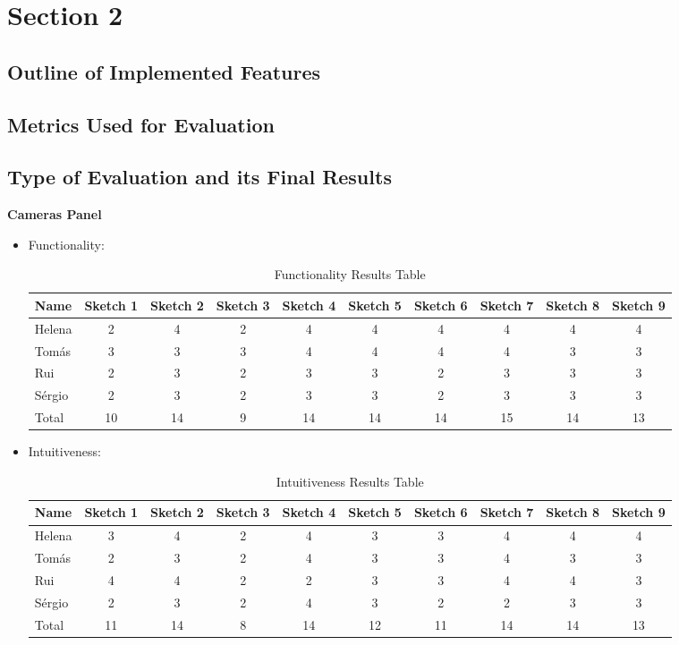 \chapter{Section 2} \label{section2}
\section{Outline of Implemented Features}
\section{Metrics Used for Evaluation}
\section{Type of Evaluation and its Final Results}
\textbf{Cameras Panel}
\begin{itemize}
    \item Functionality: 
\begin{table}[H]
\caption{Functionality Results Table}
\begin{tabular}{l*{9}{c}}
Name & Sketch 1 & Sketch 2 & Sketch 3 & Sketch 4 
& Sketch 5 & Sketch 6 & Sketch 7 & Sketch 8 & Sketch 9 \\
\hline 
Helena & 2 & 4 & 2 & 4 & 4 & 4 & 4 & 4 & 4 \\
Tomás & 3 & 3 & 3 & 4 & 4 & 4 & 4 & 3 & 3 \\ 
Rui & 2 & 3 & 2 & 3 & 3 & 2 & 3 & 3 & 3 \\ 
Sérgio & 2 & 3 & 2 & 3 & 3 & 2 & 3 & 3 & 3 \\ 
Total & 10 & 14 & 9 & 14 & 14 & 14 & 15 & 14 & 13 \\
\end{tabular}
\end{table}
\item Intuitiveness: 
\begin{table}[H]
\caption{Intuitiveness Results Table}
\begin{tabular}{l*{9}{c}}
    Name & Sketch 1 & Sketch 2 & Sketch 3 & Sketch 4 
    & Sketch 5 & Sketch 6 & Sketch 7 & Sketch 8 & Sketch 9 \\
    \hline 
    Helena & 3 & 4 & 2 & 4 & 3 & 3 & 4 & 4 & 4 \\
    Tomás & 2 & 3 & 2 & 4 & 3 & 3 & 4 & 3 & 3 \\ 
    Rui & 4 & 4 & 2 & 2 & 3 & 3 & 4 & 4 & 3 \\ 
    Sérgio & 2 & 3 & 2 & 4 & 3 & 2 & 2 & 3 & 3 \\ 
    Total & 11 & 14 & 8 & 14 & 12 & 11 & 14 & 14 & 13 \\

\end{tabular}
\end{table}
\end{itemize}

